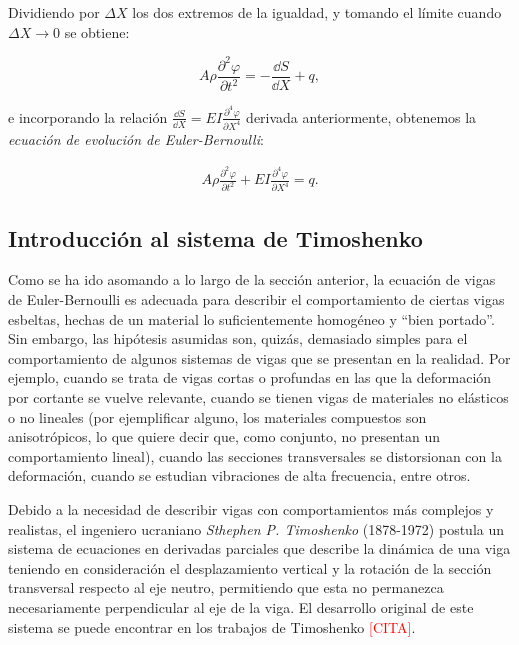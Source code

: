 Dividiendo por $\Delta X$ los dos extremos de la igualdad, y tomando el límite cuando $\Delta X \rightarrow 0$ se obtiene:

\[A \rho \frac{\partial^2 \varphi}{\partial t^2} = -\frac{\dd S}{\dd X} + q,\]

e incorporando la relación $\frac{\dd S}{\dd X} = EI \frac{\partial^4 \varphi}{\partial X^4}$ derivada anteriormente, obtenemos la \textit{ecuación de evolución de Euler-Bernoulli}:

\begin{align*}
    A \rho \frac{\partial^2 \varphi}{\partial t^2} + EI \frac{\partial^4 \varphi}{\partial X^4} = q.
\end{align*}

\subsection{Introducción al sistema de Timoshenko}
\label{ch:teoriaVigas:section:primerosmodelos:subsection:timoshenko}

Como se ha ido asomando a lo largo de la sección anterior, la ecuación de vigas de Euler-Bernoulli es adecuada para describir el comportamiento de ciertas vigas esbeltas, hechas de un material lo suficientemente homogéneo y ``bien portado''. Sin embargo, las hipótesis asumidas son, quizás, demasiado simples para el comportamiento de algunos sistemas de vigas que se presentan en la realidad. Por ejemplo, cuando se trata de vigas cortas o profundas en las que la deformación por cortante se vuelve relevante, cuando se tienen vigas de materiales no elásticos o no lineales (por ejemplificar alguno, los materiales compuestos son anisotrópicos, lo que quiere decir que, como conjunto, no presentan un comportamiento lineal), cuando las secciones transversales se distorsionan con la deformación, cuando se estudian vibraciones de alta frecuencia, entre otros. 

Debido a la necesidad de describir vigas con comportamientos más complejos y realistas, el ingeniero ucraniano \textit{Sthephen P. Timoshenko} (1878-1972) postula un sistema de ecuaciones en derivadas parciales que describe la dinámica de una viga teniendo en consideración el desplazamiento vertical y la rotación de la sección transversal respecto al eje neutro, permitiendo que esta no permanezca necesariamente perpendicular al eje de la viga. El desarrollo original de este sistema se puede encontrar en los trabajos de Timoshenko \textcolor{red}{[CITA]}.

